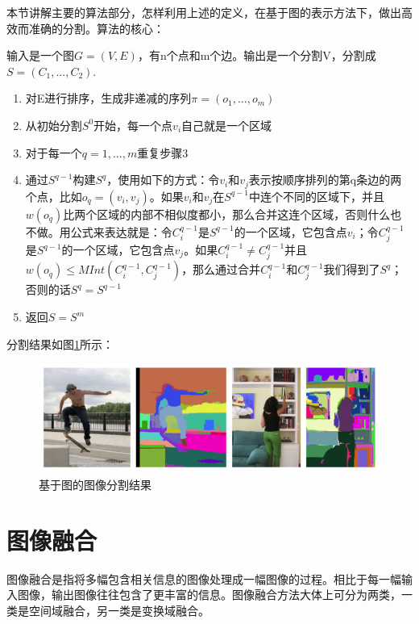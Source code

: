 本节讲解主要的算法部分，怎样利用上述的定义，在基于图的表示方法下，做出高效而准确的分割。算法的核心：

输入是一个图\(G=(V,E)\)，有n个点和m个边。输出是一个分割V，分割成\(S=(C_1,...,C_2).\)

\begin{enumerate}
\item 对E进行排序，生成非递减的序列\(\pi = (o_1,...,o_m)\)
\item 从初始分割\(S^0\)开始，每一个点\(v_i\)自己就是一个区域
\item 对于每一个\(q = 1,...,m\)重复步骤3
\item 通过\(S^{q-1}\)构建\(S^q\)，使用如下的方式：令\(v_i\)和\(v_j\)表示按顺序排列的第q条边的两个点，比如\(o_q = (v_i,v_j)\)。如果\(v_i\)和\(v_j\)在\(S^{q-1}\)中连个不同的区域下，并且\(w(o_q)\)比两个区域的内部不相似度都小，那么合并这连个区域，否则什么也不做。用公式来表达就是：令\(C_{i}^{q-1}\)是\(S^{q-1}\)的一个区域，它包含点\(v_i\)；令\(C_{j}^{q-1}\)是\(S^{q-1}\)的一个区域，它包含点\(v_j\)。如果\(C_{i}^{q-1} \neq C_{j}^{q-1}\)并且\(w(o_q) \leq MInt(C_i^{q-1},C_j^{q-1})\)，那么通过合并\(C_{i}^{q-1}\)和\(C_{j}^{q-1}\)我们得到了\(S^q\)；否则的话\(S^q = S^{q-1}\)
\item 返回\(S = S^m\)
\end{enumerate}

分割结果如图\ref{fig:segment}所示：
\begin{figure}
\centering\includegraphics[width=15cm]{imgs/ch2/segment}
\caption{基于图的图像分割结果}
\label{fig:segment}
\end{figure}

\section{图像融合}

图像融合是指将多幅包含相关信息的图像处理成一幅图像的过程。相比于每一幅输入图像，输出图像往往包含了更丰富的信息。图像融合方法大体上可分为两类，一类是空间域融合，另一类是变换域融合。

